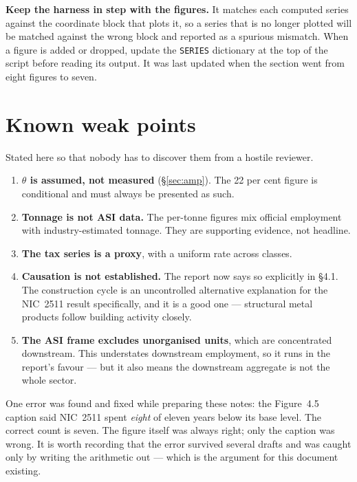 \documentclass[11pt, a4paper]{article}
\begin{document}
\textbf{Keep the harness in step with the figures.} It matches each computed series
against the coordinate block that plots it, so a series that is no longer plotted will
be matched against the wrong block and reported as a spurious mismatch. When a figure
is added or dropped, update the \texttt{SERIES} dictionary at the top of the script
before reading its output. It was last updated when the section went from eight
figures to seven.

\section{Known weak points}

Stated here so that nobody has to discover them from a hostile reviewer.

\begin{enumerate}[leftmargin=1.6em, itemsep=3pt]
\item \textbf{$\theta$ is assumed, not measured} (§\ref{sec:amp}). The 22 per cent figure is
conditional and must always be presented as such.
\item \textbf{Tonnage is not ASI data.} The per-tonne figures mix official employment
with industry-estimated tonnage. They are supporting evidence, not headline.
\item \textbf{The tax series is a proxy}, with a uniform rate across classes.
\item \textbf{Causation is not established.} The report now says so explicitly in
§4.1. The construction cycle is an uncontrolled alternative explanation for the
NIC~2511 result specifically, and it is a good one --- structural metal products
follow building activity closely.
\item \textbf{The ASI frame excludes unorganised units}, which are concentrated
downstream. This understates downstream employment, so it runs in the report's
favour --- but it also means the downstream aggregate is not the whole sector.
\end{enumerate}

\vspace{0.3cm}
\noindent One error was found and fixed while preparing these notes: the Figure~4.5
caption said NIC~2511 spent \emph{eight} of eleven years below its base level. The
correct count is seven. The figure itself was always right; only the caption was
wrong. It is worth recording that the error survived several drafts and was caught
only by writing the arithmetic out --- which is the argument for this document
existing.
\end{document}
